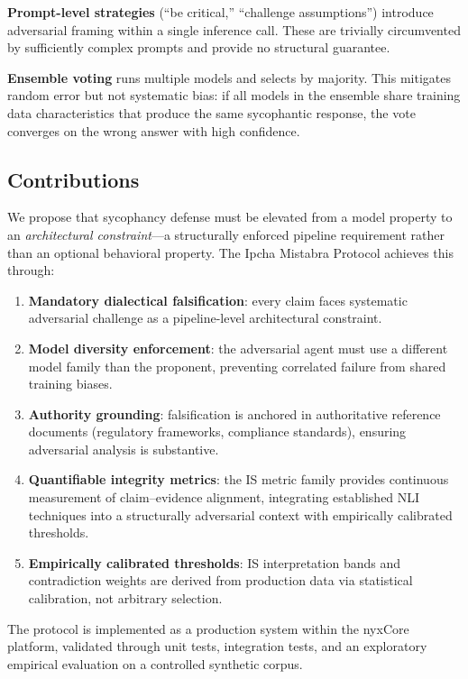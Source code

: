 \documentclass[11pt,a4paper]{article}
\begin{document}
\textbf{Prompt-level strategies} (``be critical,'' ``challenge
assumptions'') introduce adversarial framing within a single
inference call.  These are trivially circumvented by sufficiently
complex prompts and provide no structural guarantee.

\textbf{Ensemble voting} runs multiple models and selects by
majority.  This mitigates random error but not systematic bias: if
all models in the ensemble share training data characteristics that
produce the same sycophantic response, the vote converges on the
wrong answer with high confidence.

\subsection{Contributions}

We propose that sycophancy defense must be elevated from a model
property to an \emph{architectural constraint}---a structurally
enforced pipeline requirement rather than an optional behavioral
property.  The Ipcha Mistabra Protocol achieves this through:

\begin{enumerate}[leftmargin=*]
  \item \textbf{Mandatory dialectical falsification}: every claim
        faces systematic adversarial challenge as a pipeline-level
        architectural constraint.
  \item \textbf{Model diversity enforcement}: the adversarial agent
        must use a different model family than the proponent,
        preventing correlated failure from shared training biases.
  \item \textbf{Authority grounding}: falsification is anchored in
        authoritative reference documents (regulatory frameworks,
        compliance standards), ensuring adversarial analysis is
        substantive.
  \item \textbf{Quantifiable integrity metrics}: the IS metric
        family provides continuous measurement of claim--evidence
        alignment, integrating established NLI techniques into a
        structurally adversarial context with empirically calibrated
        thresholds.
  \item \textbf{Empirically calibrated thresholds}: IS
        interpretation bands and contradiction weights are derived
        from production data via statistical calibration, not
        arbitrary selection.
\end{enumerate}

The protocol is implemented as a production system within the nyxCore
platform, validated through unit tests, integration tests, and an
exploratory empirical evaluation on a controlled
synthetic corpus.
\end{document}
